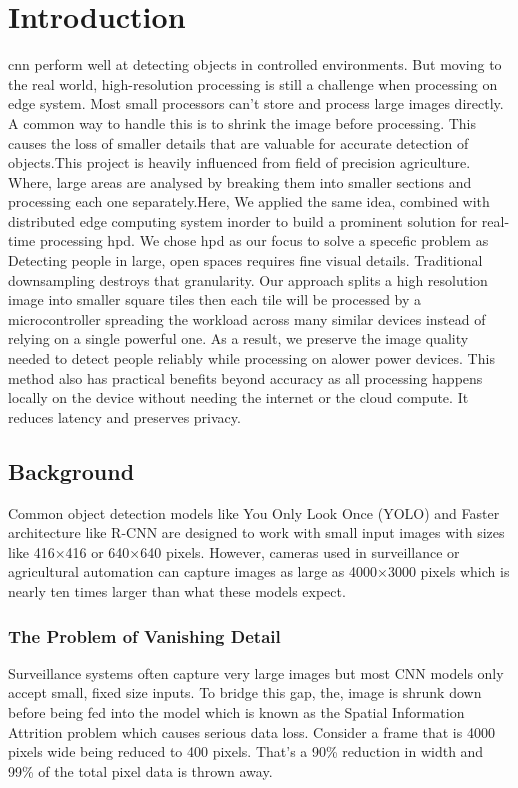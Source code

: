 \chapter{Introduction}

\gls{cnn} perform well at detecting objects in controlled environments. But moving to the real world, high-resolution processing is still a challenge when processing on edge system. Most small processors can’t store and process large images directly. A common way to handle this is to shrink the image before processing. This causes the loss of smaller details that are valuable for accurate detection of objects.This project is heavily influenced from field of precision agriculture. Where, large areas are analysed by breaking them into smaller sections and processing each one separately.Here, We applied the same idea, combined with distributed edge computing system inorder to build a prominent solution for real-time processing \gls{hpd}. We chose \gls{hpd} as our focus to solve a specefic problem as Detecting people in large, open spaces requires fine visual details. Traditional downsampling destroys that granularity.
Our approach splits a high resolution image into smaller square tiles then each tile will be  processed by a microcontroller spreading the workload across many similar devices instead of relying on a single powerful one. As a result, we preserve the image quality needed to detect people reliably while processing on alower power devices.
This method also has practical benefits beyond accuracy as  all processing happens locally on the device without needing the internet or the cloud compute. It reduces latency and preserves privacy.


\section{Background}

Common object detection models like You Only Look Once (YOLO) and Faster architecture like R-CNN are designed to work with small input images with sizes like  416×416 or 640×640 pixels. However, cameras used in surveillance or agricultural automation can capture images as large as 4000×3000 pixels which is nearly ten times larger than what these models expect. 


\subsection*{The Problem of Vanishing Detail}
Surveillance systems often capture very large images but most CNN models only accept small, fixed size inputs. To bridge this gap, the, image is shrunk down before being fed into the model which is known as the Spatial Information Attrition problem which causes serious data loss. 
Consider a frame that is 4000 pixels wide being reduced to 400 pixels. That’s a 90\% reduction in width and 99\% of the total pixel data is thrown away.

